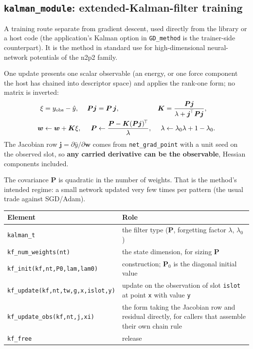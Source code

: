 \documentclass[10pt,a4paper]{article}
\newcommand{\code}[1]{\texttt{#1}}
\newcommand{\mi}[1]{\boldsymbol{#1}}
\begin{document}
\subsection{\code{kalman\_module}: extended-Kalman-filter training}

A training route separate from gradient descent, used directly from
the library or a host code (the application's Kalman option in
\code{GD\_method} is the trainer-side counterpart). It is the method
in standard use for high-dimensional neural-network potentials of the
n2p2 family.

One update presents one scalar observable (an energy, or one force
component the host has chained into descriptor space) and applies the
rank-one form; no matrix is inverted:
\begin{align*}
\xi &= y_{\rm obs} - \hat y, &
\mi{P}\mi{j} &= \mi{P}\,\mi{j}, &
\mi{K} &= \frac{\mi{P}\mi{j}}{\lambda + \mi{j}^{\!\top}\mi{P}\mi{j}},\\
\mi{w} &\leftarrow \mi{w} + \mi{K}\xi, &
\mi{P} &\leftarrow \frac{\mi{P}-\mi{K}(\mi{P}\mi{j})^{\!\top}}{\lambda}, &
\lambda &\leftarrow \lambda_0\lambda + 1 - \lambda_0 .
\end{align*}
The Jacobian row $\mi{j}=\partial\hat y/\partial\mi{w}$ comes from
\code{net\_grad\_point} with a unit seed on the observed slot, so
\textbf{any carried derivative can be the observable}, Hessian
components included.

The covariance $\mi{P}$ is quadratic in the number of weights. That is
the method's intended regime: a small network updated very few times
per pattern (the usual trade against SGD/Adam).

\begin{longtable}{@{}p{}p{}@{}}
\toprule
Element & Role \\
\midrule
\endhead
\code{kalman\_t} & the filter type ($\mi{P}$, forgetting factor $\lambda$, $\lambda_0$)\\
\code{kf\_num\_weights(nt)} & the state dimension, for sizing $\mi{P}$\\
\code{kf\_init(kf,nt,P0,lam,lam0)} & construction; $\mi{P}_0$ is the diagonal initial value\\
\code{kf\_update(kf,nt,tw,g,x,islot,y)} & update on the observation of slot \code{islot} at point \code{x} with value \code{y}\\
\code{kf\_update\_obs(kf,nt,j,xi)} & the form taking the Jacobian row and residual directly, for callers that assemble their own chain rule\\
\code{kf\_free} & release\\
\bottomrule
\end{longtable}
\end{document}
